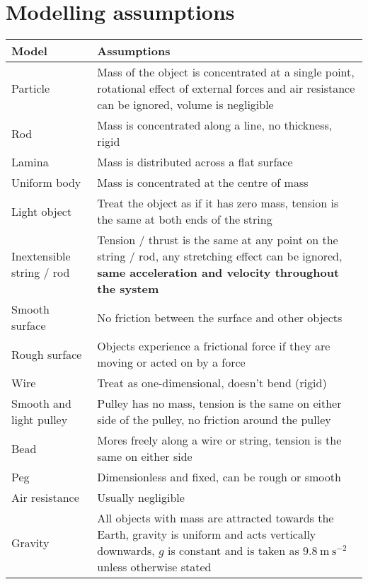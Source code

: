 \section{Modelling assumptions}
\begin{tabular}{|m{3.9cm} | m{13.5cm}|}
	\hline
	\textbf{Model} & \textbf{Assumptions} \\
	\hline
	Particle & Mass of the object is concentrated at a single point, rotational effect of external forces and air resistance can be ignored, volume is negligible \\
	\hline
	Rod & Mass is concentrated along a line, no thickness, rigid \\
	\hline
	Lamina & Mass is distributed across a flat surface \\
	\hline
	Uniform body & Mass is concentrated at the centre of mass \\
	\hline
	Light object & Treat the object as if it has zero mass, tension is the same at both ends of the string  \\
	\hline
	Inextensible string / rod & Tension / thrust is the same at any point on the string / rod, any stretching effect can be ignored, \textbf{same acceleration and velocity throughout the system} \\
	\hline
	Smooth surface & No friction between the surface and other objects\\
	\hline
	Rough surface &  Objects experience a frictional force if they are moving or acted on by a force  \\
	\hline
	Wire &  Treat as one-dimensional, doesn't bend (rigid) \\
	\hline
	Smooth and light pulley & Pulley has no mass, tension is the same on either side of the pulley, no friction around the pulley \\
	\hline
	Bead & Mores freely along a wire or string, tension is the same on either side  \\
	\hline
	Peg & Dimensionless and fixed, can be rough or smooth \\
	\hline
	Air resistance & Usually negligible  \\
	\hline
	Gravity &  All objects with mass are attracted towards the Earth, gravity is uniform and acts vertically downwards, $g$ is constant and is taken as $9.8 \: \mathrm{m} \: \mathrm{s}^{-2}$ unless otherwise stated \\
	\hline
\end{tabular}